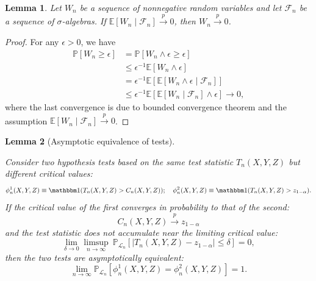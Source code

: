 \documentclass[aos]{imsart}
\theoremstyle{plain}
\newtheorem{lemma}{Lemma}
\theoremstyle{remark}
\newcommand{\E}{\mathbb E}								%
\renewcommand{\P}{\mathbb{P}}							%
\newcommand{\indicator}{\mathbbm 1}						%
\newcommand{\convp}{\overset p \rightarrow}             %
\newcommand{\srx}{X}									%
\newcommand{\srz}{Z}									%
\newcommand{\sry}{Y}									%
\newcommand{\law}{\mathcal L}							%
\begin{document}
\begin{lemma}
	\label{lem:conditional-expectation-to-unconditional}
	Let $W_n$ be a sequence of nonnegative random variables and let $\mathcal F_n$ be a sequence of $\sigma$-algebras. If $\E[W_n \mid \mathcal{F}_n]\convp 0$, then $ W_n \convp 0$.
\end{lemma}
\begin{proof}
	For any $\epsilon>0$, we have
	\begin{align}
		\P[W_n \geq \epsilon] &= \P[W_n \wedge \epsilon \geq \epsilon] \\
		&\leq \epsilon^{-1} \E[W_n \wedge \epsilon] \\
		&= \epsilon^{-1} \E[\E[W_n \wedge \epsilon\mid \mathcal{F}_n]]\\
		&\leq \epsilon^{-1} \E[\E[W_n \mid \mathcal{F}_n]\wedge \epsilon] \to 0,
	\end{align}
	where the last convergence is due to bounded convergence theorem and the assumption $\E[W_n \mid \mathcal{F}_n]\convp 0$. 
\end{proof}


\begin{lemma}[Asymptotic equivalence of tests] \label{lem:equivalence-lemma}
	
	Consider two hypothesis tests based on the same test statistic $T_n(\srx, \sry, \srz)$ but different critical values:
	\begin{equation*}
		\phi_n^1(\srx, \sry, \srz) \equiv \indicator(T_n(\srx, \sry, \srz) > C_n(\srx, \sry, \srz)); \quad \phi_n^2(\srx, \sry, \srz) \equiv \indicator(T_n(\srx, \sry, \srz) > z_{1-\alpha}). 
	\end{equation*}
	If the critical value of the first converges in probability to that of the second:
	\begin{equation}
		C_n(\srx, \sry, \srz) \convp z_{1-\alpha}
		\label{eq:convergence-of-critical-value}
	\end{equation}
	and the test statistic does not accumulate near the limiting critical value:
	\begin{equation}
		\lim_{\delta \rightarrow 0}\limsup_{n \rightarrow \infty}\ \P_{\law_n}[|T_n(\srx, \sry, \srz)-z_{1-\alpha}| \leq \delta] = 0,
		\label{eq:non-accumulation-app}
	\end{equation}
	then the two tests are asymptotically equivalent:
	\begin{equation}
		\lim_{n \rightarrow \infty}\P_{\law_n}[\phi_n^{1}(\srx, \sry, \srz) = \phi_n^2(\srx, \sry, \srz)] = 1.
	\end{equation}
\end{lemma}
\end{document}

